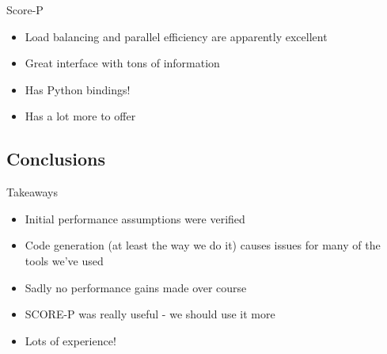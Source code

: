 \documentclass[pdf,aspectratio=169]{beamer}
\begin{document}
\begin{frame}[fragile]{Score-P}
  \begin{itemize}
    \item Load balancing and parallel efficiency are apparently excellent
    \item Great interface with tons of information
    \item Has Python bindings!
    \item Has a lot more to offer
  \end{itemize}
\end{frame}


\subsection{Conclusions}

\begin{frame}{Takeaways}
  \begin{itemize}
    \item Initial performance assumptions were verified
    \item Code generation (at least the way we do it) causes issues for many of the tools we've used
    \item Sadly no performance gains made over course
    \item SCORE-P was really useful - we should use it more
    \item Lots of experience!
  \end{itemize}
\end{frame}
\end{document}
